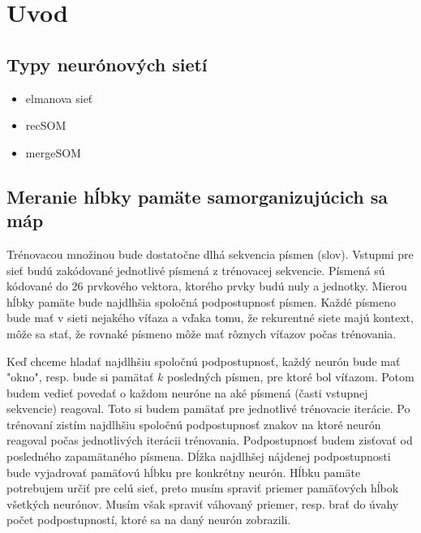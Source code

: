 \chapter{Uvod}


\section{Typy neurónových sietí}
\begin{itemize}
	\item elmanova sieť
	\item recSOM
	\item mergeSOM
\end{itemize}

\section{Meranie hĺbky pamäte samorganizujúcich sa máp}
Trénovacou množinou bude dostatočne dlhá sekvencia písmen (slov).
Vstupmi pre sieť budú zakódované jednotlivé písmená z trénovacej sekvencie.
Písmená sú kódované do 26 prvkového vektora, ktorého prvky budú nuly a jednotky.
Mierou hĺbky pamäte bude najdlhšia spoločná podpostupnosť písmen.
Každé písmeno bude mať v sieti nejakého víťaza a vďaka tomu, že rekurentné siete majú kontext, môže sa stať, že rovnaké písmeno môže mať rôznych víťazov počas trénovania.

Keď chceme hladať najdlhšiu spoločnú podpostupnosť, každý neurón bude mať "okno", resp. bude si pamätať $k$ posledných písmen, pre ktoré bol víťazom. Potom budem vedieť povedať o každom neuróne na aké písmená (časti vstupnej sekvencie) reagoval.
Toto si budem pamätať pre jednotlivé trénovacie iterácie. Po trénovaní zistím najdlhšiu spoločnú podpostupnosť znakov na ktoré neurón reagoval počas jednotlivých iterácii trénovania. Podpostupnosť budem zisťovať od posledného zapamätaného písmena. Dĺžka najdlhšej nájdenej podpostupnosti bude vyjadrovať pamäťovú hĺbku pre konkrétny neurón. Hĺbku pamäte potrebujem určiť pre celú sieť, preto musím spraviť priemer pamäťových hĺbok všetkých neurónov. Musím však spraviť váhovaný priemer, resp. brať do úvahy počet podpostupností, ktoré sa na daný neurón zobrazili.








